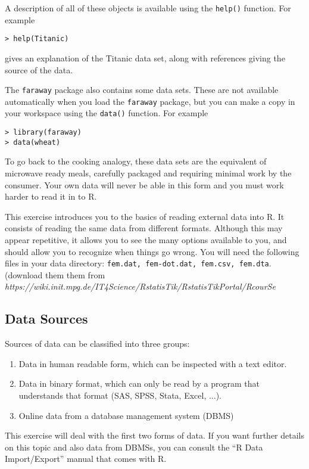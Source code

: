 \documentclass[12pt]{article}
\begin{document}
A description of all of these objects is available using the \texttt{help()} function. For example
\begin{verbatim}
> help(Titanic)
\end{verbatim}
gives an explanation of the Titanic data set, along with references giving the source of the data.

The \texttt{faraway} package also contains some data sets. These are not available automatically when you load the \texttt{faraway} package, but you can make a copy in your workspace using the \texttt{data()} function. For example

\begin{verbatim}
> library(faraway)
> data(wheat)
\end{verbatim}

To go back to the cooking analogy, these data sets are the equivalent of microwave ready meals,
carefully packaged and requiring minimal work by the consumer. Your own data will never be
able in this form and you must work harder to read it in to R.

This exercise introduces you to the basics of reading external data into R. It consists of reading
the same data from different formats. Although this may appear repetitive, it allows you to see
the many options available to you, and should allow you to recognize when things go wrong.
You will need the following files in your data directory: \texttt{fem.dat, fem-dot.dat, fem.csv, fem.dta}. (download them them from \emph{https://wiki.init.mpg.de/IT4Science/RstatisTik/RstatisTikPortal/RcourSe}


\subsection{Data Sources}
Sources of data can be classified into three groups:
\begin{enumerate}
\item Data in human readable form, which can be inspected with a text editor.
\item Data in binary format, which can only be read by a program that understands that format
(SAS, SPSS, Stata, Excel, ...).
\item Online data from a database management system (DBMS)
\end{enumerate}

This exercise will deal with the first two forms of data. If you want further details on this topic and also data from DBMSs, you can consult
the “R Data Import/Export” manual that comes with R.
\end{document}
